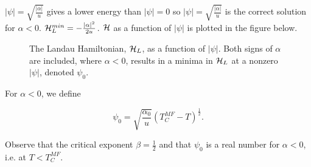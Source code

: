 $|\psi| =   \sqrt{\frac{|\alpha|}{u}} $ gives a lower energy  than $|\psi| =0$ so $|\psi| =   \sqrt{\frac{|\alpha|}{u}} $ is the correct solution for $\alpha<0$. $\mathcal{H}_L^{min} = -\frac{|\alpha|^2}{2u}$. $\mathcal{H}$ as a function of $|\psi|$ is plotted in the figure below.


\begin{figure}
\centering
{}
\caption{The Landau Hamiltonian, $\mathcal{H}_L$, as a function of $|\psi|$. Both signs of $\alpha$ are included, where $\alpha<0$, results in a minima in $\mathcal{H}_L$ at a nonzero $|\psi|$, denoted $\psi_0$.}
\label{fig:1D_H}
\end{figure}

For $\alpha<0$, we define 

\begin{equation}
\psi_0 = \sqrt{\frac{\alpha_0}{u}} (T_C^{MF} - T)^\frac{1}{2}.
\end{equation}

Observe that the critical exponent $\beta = \frac{1}{2}$ and that $\psi_0$ is a real number for $\alpha<0$, i.e. at $T<T_C^{MF}$. 


\newpage

